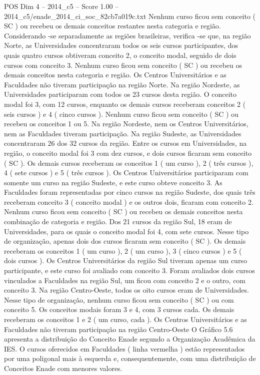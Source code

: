 \begin{textsample}{POS Dim 4 – 2014\_c5 – Score 1.00 – 2014\_c5/enade\_2014\_ci\_soc\_82cb7a019c.txt}
Nenhum curso ficou sem conceito ( SC ) ou recebeu os demais conceitos restantes nesta categoria e região.
Considerando -se separadamente as regiões brasileiras, verifica -se que, na região Norte, as Universidades concentraram todos os seis cursos participantes, dos quais quatro cursos obtiveram conceito 2, o conceito modal, seguido de dois cursos com conceito 3.
Nenhum curso ficou sem conceito ( SC ) ou recebeu os demais conceitos nesta categoria e região.
Os Centros Universitários e as Faculdades não tiveram participação na região Norte.
Na região Nordeste, as Universidades participaram com todos os 23 cursos desta região.
O conceito modal foi 3, com 12 cursos, enquanto os demais cursos receberam conceitos 2 ( seis cursos ) e 4 ( cinco cursos ).
Nenhum curso ficou sem conceito ( SC ) ou recebeu os conceitos 1 ou 5.
Na região Nordeste, nem os Centros Universitários, nem as Faculdades tiveram participação.
Na região Sudeste, as Universidades concentraram 26 dos 32 cursos da região.
Entre os cursos em Universidades, na região, o conceito modal foi 3 com dez cursos, e dois cursos ficaram sem conceito ( SC ).
Os demais cursos receberam os conceitos 1 ( um curso ), 2 ( três cursos ), 4 ( sete cursos ) e 5 ( três cursos ).
Os Centros Universitários participaram com somente um curso na região Sudeste, e este curso obteve conceito 3.
As Faculdades foram representadas por cinco cursos na região Sudeste, dos quais três receberam conceito 3 ( conceito modal ) e os outros dois, ficaram com conceito 2.
Nenhum curso ficou sem conceito ( SC ) ou recebeu os demais conceitos nesta combinação de categoria e região.
Dos 21 cursos da região Sul, 18 eram de Universidades, para os quais o conceito modal foi 4, com sete cursos.
Nesse tipo de organização, apenas dois dos cursos ficaram sem conceito ( SC ).
Os demais receberam os conceitos 1 ( um curso ), 2 ( um curso ), 3 ( cinco cursos ) e 5 ( dois cursos ).
Os Centros Universitários da região Sul tiveram apenas um curso participante, e este curso foi avaliado com conceito 3.
Foram avaliados dois cursos vinculados a Faculdades na região Sul, um ficou com conceito 2 e o outro, com conceito 3.
Na região Centro-Oeste, todos os oito cursos eram de Universidades.
Nesse tipo de organização, nenhum curso ficou sem conceito ( SC ) ou com conceito 5.
Os conceitos modais foram 3 e 4, com 3 cursos cada.
Os demais receberam os conceitos 1 e 2 ( um curso, cada ).
Os Centros Universitários e as Faculdades não tiveram participação na região Centro-Oeste O Gráfico 5.6 apresenta a distribuição do Conceito Enade segundo a Organização Acadêmica da IES.
O cursos oferecidos em Faculdades ( linha vermelha ) estão representados por uma poligonal mais à esquerda e, consequentemente, com uma distribuição de Conceitos Enade com menores valores.

\end{textsample}
